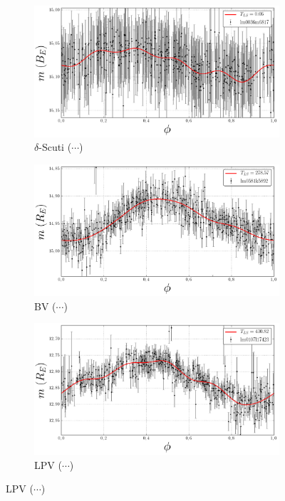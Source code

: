 \begin{figure}[H]
\begin{subfigure}[t]{0.49\textwidth}
	\end{subfigure}
	\begin{subfigure}[t]{0.49\textwidth}
		\centering
		\caption{$\delta$-Scuti ($\cdots$)}
		\label{fig:lightcurve-dsct}
		\includegraphics[width=\textwidth]{figures/lightcurves/dsct.png}		
	\end{subfigure}
	\begin{subfigure}[t]{0.49\textwidth}
		\centering
		\caption{BV ($\cdots$)}
		\label{fig:lightcurve-lpv}
		\includegraphics[width=\textwidth]{figures/lightcurves/bv.png}		
	\end{subfigure}
	\begin{subfigure}[t]{0.49\textwidth}
		\centering
		\caption{LPV ($\cdots$)}
		\label{fig:lightcurve-bv}
		\includegraphics[width=\textwidth]{figures/lightcurves/lpv.png}		

\end{subfigure}
\end{figure}
